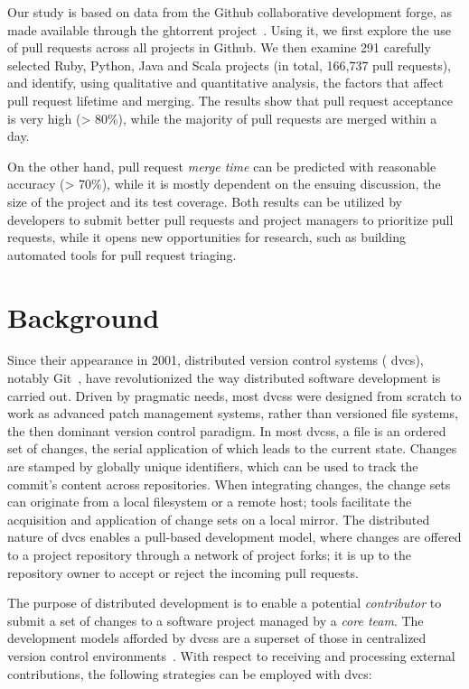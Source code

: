 \documentclass{sig-alternate}
\begin{document}
Our study is based on data from the Github collaborative development forge, as
made available through the {\sc ght}orrent project~\cite{GS12}. Using it, we
first explore the use of pull requests across all projects in Github. We then
examine 291 carefully selected Ruby, Python, Java and Scala projects (in total,
166,737 pull requests), and identify, using  
qualitative and quantitative analysis, the
factors that affect pull request lifetime and merging. The results show that
pull request acceptance is very high (> 80\%), while the majority of
pull requests are merged within a day.

On the other hand, pull request \emph{merge time} can be predicted with
reasonable accuracy (> 70\%), while it is mostly dependent on the ensuing
discussion, the size of the project and its test coverage. Both results can be
utilized by developers to submit better pull requests and project managers to
prioritize pull requests, while it opens new opportunities for research, such as
building automated tools for pull request triaging.

\section{Background} \label{sec:bg}

Since their appearance in 2001, distributed version control systems ({\sc
dvcs}), notably Git~\cite{Chaco09}, have revolutionized the way distributed
software development is carried out. Driven by pragmatic needs, most {\sc dvcs}s
were designed from scratch to work as advanced patch management systems, rather
than versioned file systems, the then dominant version control paradigm. In most
{\sc dvcs}s, a file is an ordered set of changes, the serial application of
which leads to the current state. Changes are stamped by globally unique
identifiers, which can be used to track the commit's content across
repositories. When integrating changes, the change sets can originate from a
local filesystem or a remote host; tools facilitate the acquisition and
application of change sets on a local mirror. The distributed nature of {\sc
dvcs} enables a pull-based development model, where changes are offered to a
project repository through a network of project forks; it is up to the
repository owner to accept or reject the incoming pull requests.

The purpose of distributed development is to enable a potential
\emph{contributor} to submit a set of changes to a software project managed by a
\emph{core team}. The development models afforded by {\sc dvcs}s are a superset
of those in centralized version control environments~\cite{Shiha12,Bird09}.
With respect to receiving and processing external contributions, the following
strategies can be employed with {\sc dvc}s:
\end{document}
